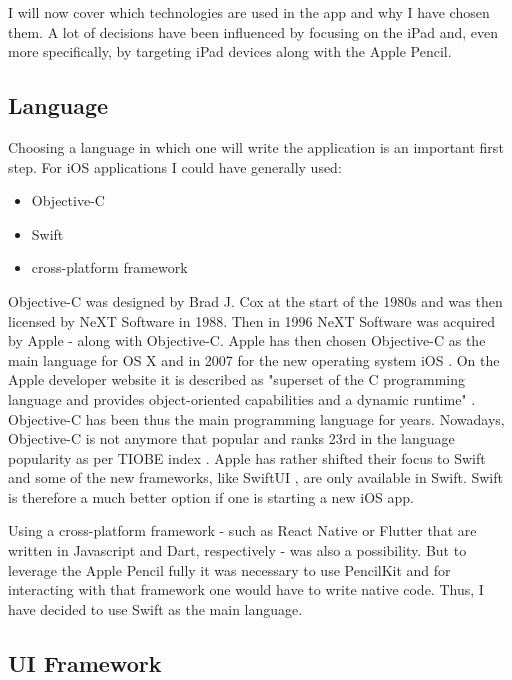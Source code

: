 I will now cover which technologies are used in the app and why I have chosen them. A lot of decisions have been influenced by focusing on the iPad and, even more specifically, by targeting iPad devices along with the Apple Pencil. 

\subsection{Language}

Choosing a language in which one will write the application is an important first step. For iOS applications I could have generally used:
\begin{itemize}
    \item Objective-C
    \item Swift
    \item cross-platform framework
\end{itemize}

Objective-C was designed by Brad J. Cox at the start of the 1980s and was then licensed by NeXT Software in 1988. Then in 1996 NeXT Software was acquired by Apple - along with Objective-C. Apple has then chosen Objective-C as the main language for OS X and in 2007 for the new operating system iOS \cite{objective-c-programming}. On the Apple developer website it is described as "superset of the C programming language and provides object-oriented capabilities and a dynamic runtime" \cite{objective-c}. Objective-C has been thus the main programming language for years. Nowadays, Objective-C is not anymore that popular and ranks 23rd in the language popularity as per TIOBE index \cite{tiobe-index}. Apple has rather shifted their focus to Swift and some of the new frameworks, like SwiftUI \cite{swiftui}, are only available in Swift. Swift is therefore a much better option if one is starting a new iOS app.

Using a cross-platform framework - such as React Native \cite{react-native} or Flutter \cite{flutter} that are written in Javascript and Dart, respectively - was also a possibility. But to leverage the Apple Pencil fully it was necessary to use PencilKit \cite{pencilkit} and for interacting with that framework one would have to write native code. Thus, I have decided to use Swift as the main language.

\subsection{UI Framework}

